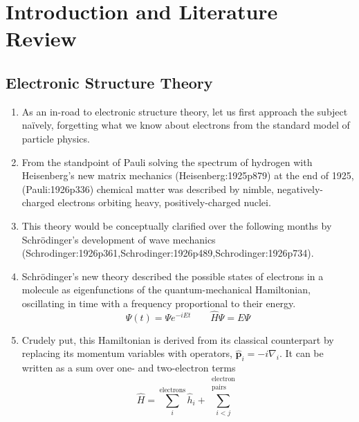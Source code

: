 \chapter[%
    Introduction and Literature Review
]{%
    Introduction and Literature Review
}

\section{Electronic Structure Theory}

\begin{enumerate}
    \item
        As an in-road to electronic structure theory, let us first approach the
        subject na\"ively, forgetting what we know about electrons from the
        standard model of particle physics.
    \item
        From the standpoint of Pauli solving the spectrum of hydrogen with
        Heisenberg's new matrix mechanics (Heisenberg:1925p879) at the end of
        1925,(Pauli:1926p336) chemical matter was described by nimble,
        negatively-charged electrons orbiting heavy, positively-charged nuclei.
    \item
        This theory would be conceptually clarified over the following months by
        Schr\"odinger's development of wave mechanics
        (Schrodinger:1926p361,Schrodinger:1926p489,Schrodinger:1926p734).
    \item
        Schr\"odinger's new theory described the possible states of electrons in
        a molecule as eigenfunctions of the quantum-mechanical Hamiltonian,
        oscillating in time with a frequency proportional to their energy.
        \begin{equation}
            \Psi(t)
            =
            \Psi
            e^{-iEt}
            \qquad
            \hat{H}
            \Psi
            =
            E
            \Psi
        \end{equation}
    \item
        Crudely put, this Hamiltonian is derived from its classical counterpart
        by replacing its momentum variables with operators,
        \(
            \hat{\mathbf{p}}_i
            =
            -i
            \nabla_i
        \).
        It can be written as a sum over one- and two-electron terms
        \begin{equation}
            \hat{H}
            =
            \sum_i^\text{electrons}
            \hat{h}_i
            +
            \sum_{i<j}^{\substack{\text{electron}\\\text{pairs}}}

\end{equation}
\end{enumerate}
